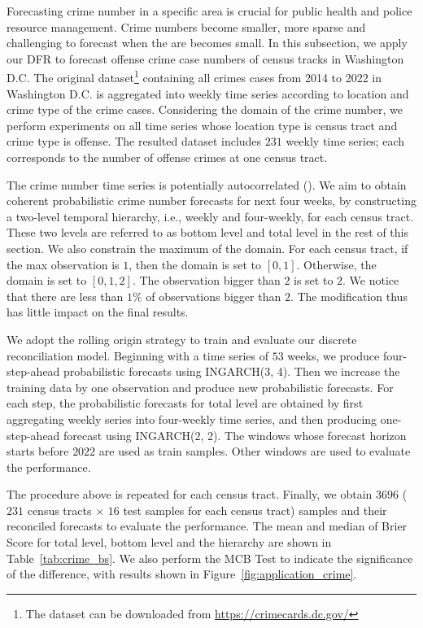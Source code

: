 \documentclass[a4paper,review,12pt,authoryear]{elsarticle}
\begin{document}
Forecasting crime number in a specific area is crucial for public health and police resource management.
Crime numbers become smaller, more sparse and challenging to forecast  when the are becomes small.
In this subsection, we apply our DFR to forecast offense crime case numbers of census tracks in Washington D.C. 
The original dataset\footnote{The dataset can be downloaded from \url{https://crimecards.dc.gov/}} containing all crimes cases from 2014 to 2022 in Washington D.C. is aggregated into weekly time series according to location and crime type of the crime cases. 
Considering the domain of the crime number, we perform experiments on all time series whose location type is census tract and crime type is offense.
The resulted dataset includes $231$ weekly time series; each corresponds to the number of offense crimes at one census tract.

The crime number time series is potentially autocorrelated (\citealp{aldor-noimanSpatioTemporalLowCount2013}). 
We aim to obtain coherent probabilistic crime number forecasts for next four weeks, by constructing a two-level temporal hierarchy, i.e., weekly and four-weekly, for each census tract. 
These two levels are referred to as bottom level and total level in the rest of this section. 
We also constrain the maximum of the domain. 
For each census tract, if the max observation is $1$, then the domain is set to $[0, 1]$. Otherwise, the domain is set to $[0, 1, 2]$. The observation bigger than $2$ is set to $2$. 
We notice that there are less than $1\%$ of observations bigger than $2$. The modification thus has little impact on the final results.

We adopt the rolling origin strategy to train and evaluate our discrete reconciliation model. 
Beginning with a time series of $53$ weeks, we produce four-step-ahead probabilistic forecasts using INGARCH(3, 4). 
Then we increase the training data by one observation and produce new probabilistic forecasts. 
For each step, the probabilistic forecasts for total level are obtained by first aggregating weekly series into four-weekly time series, and then producing one-step-ahead forecast using INGARCH(2, 2).
The windows whose forecast horizon starts before $2022$ are used as train samples. 
Other windows are used to evaluate the performance.

The procedure above is repeated for each census tract. 
Finally, we obtain $3696$ ($231$ census tracts $\times$ $16$ test samples for each census tract) samples and their reconciled forecasts to evaluate the performance. 
The mean and median of Brier Score for total level, bottom level and the hierarchy are shown in Table~\ref{tab:crime_bs}. 
We also perform the MCB Test to indicate the significance of the difference, with results shown in Figure~\ref{fig:application_crime}.
\end{document}
